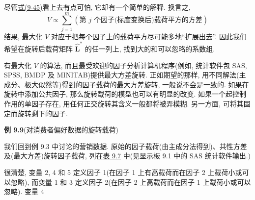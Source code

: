 尽管\hyperref[eq:9-45]{式(9-45)}看上去有点可怕, 它却有一个简单的解释. 换言之,
\label{eq:9-46}
\begin{equation}
V\propto\sum_{j=1}^{m}(\text{第 }j\text{ 个因子(标度变换后)载荷平方的方差}) \tag{9-46}
\end{equation}
结果, 最大化 $V$ 对应于把每个因子上的载荷平方尽可能多地“扩展出去”. 因此我们希望在旋转后载荷矩阵 $\hat{\mathbf{L}}^*$ 的任一列上, 找到大的和可以忽略的系数组.

有最大化 $V$ 的算法, 而且最受欢迎的因子分析计算机程序(例如, 统计软件包 SAS, SPSS, BMDP 及 MINITAB)提供最大方差旋转. 正如期望的那样, 用不同解法(主成分、极大似然等)得到的因子载荷的最大方差旋转, 一般说不会是一致的. 如果在旋转中添加公共因子, 那么旋转载荷的模型也可以有明显的改变. 如果一个起控制作用的单因子存在, 用任何正交旋转其含义一般都将被弄模糊. 另一方面, 可将其固定而旋转剩下的因子.

\noindent\textbf{例 9.9}\quad (对消费者偏好数据的旋转载荷)

我们回到例 9.3 中讨论的营销数据. 原始的因子载荷(由主成分法得到)、共性方差及(最大方差)旋转因子载荷, 列在\hyperref[tab:9.7]{表 9.7} 中(见显示板 9.1 中的 SAS 统计软件输出.)

很清楚, 变量 2, 4 和 5 定义因子 1(在因子 1 上有高载荷而在因子 2 上载荷小或可以忽略), 而变量 1 和 3 定义因子 2(在因子 2 上高载荷而在因子 1 上载荷小或可以忽略). 变量 4
